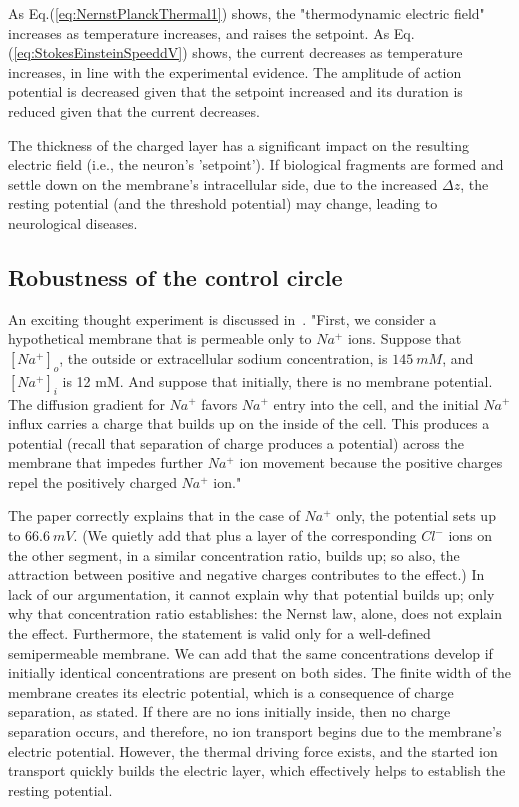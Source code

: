 As Eq.(\ref{eq:NernstPlanckThermal1}) shows, the "thermodynamic electric field" increases
as temperature increases, and raises the setpoint. As Eq.(\ref{eq:StokesEinsteinSpeeddV})
shows, the current decreases as temperature increases, in line with the experimental evidence.
The amplitude of action potential is decreased given that the setpoint increased
and its duration is reduced given that the current decreases.



The thickness of the charged layer has a significant impact on the resulting electric field (i.e., the neuron's 'setpoint'). If biological fragments are formed and settle down on the membrane's intracellular side, due to the increased $\Delta z$, the resting potential (and the threshold potential) may change, leading to neurological diseases.


\subsection[Robustness]{Robustness of the control circle\label{sec:Single-Robustness}}

An exciting thought experiment is discussed in~\cite{OriginMembranePotential:2018}. "First, we consider a hypothetical membrane that is permeable only to $Na^+$ ions. Suppose that $[Na^+]_o$, the outside or extracellular sodium concentration, is $145\ mM$, and $[Na^+]_i$ is 12 mM. And suppose that initially, there is no membrane potential. The diffusion gradient for $Na^+$ favors $Na^+$ entry into the cell, and the initial $Na^+$ influx carries a charge that builds up on the inside of the cell. This produces a potential (recall that separation of charge produces a potential) across the membrane that impedes further $Na^+$ ion movement because the positive charges repel the positively charged $Na^+$ ion."

The paper correctly explains that in the case of $Na^+$ only, the potential sets up
to $66.6\ mV$. (We quietly add that plus a layer of the corresponding $Cl^-$ ions on the other segment, in a similar concentration ratio, builds up; so also, the attraction between positive and negative charges contributes to the effect.) 
In lack of our argumentation, it cannot explain why 
that potential builds up; only why that concentration ratio
establishes: the Nernst law, alone, does not explain the effect. Furthermore, the statement is valid only for
a well-defined semipermeable membrane.
We can add that the same concentrations develop if initially identical concentrations
are present on both sides. 
The finite width of the membrane creates its electric potential, which is a consequence of charge separation, as stated.
If there are no ions initially inside, then no charge separation occurs, and therefore, no ion transport begins due to the membrane's electric potential. However, the thermal driving force exists, and the started ion transport quickly builds the electric layer, which effectively helps to establish the resting potential. 

